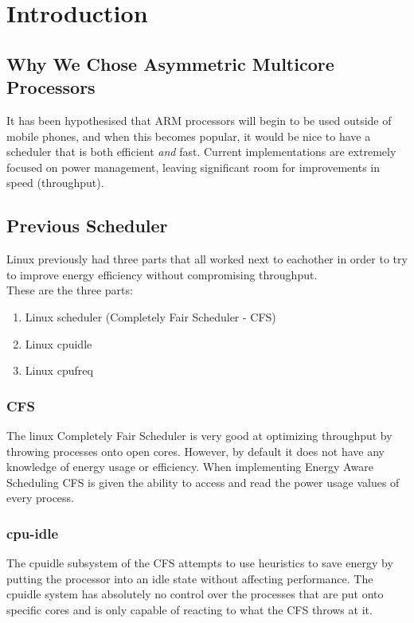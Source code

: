 \section{Introduction}
\subsection{Why We Chose Asymmetric Multicore Processors}
It has been hypothesised that ARM processors will begin to be used outside of mobile phones, and when this becomes popular, it would be nice to have a scheduler that is both efficient \textit{and} fast. Current implementations are extremely focused on power management, leaving significant room for improvements in speed (throughput).

\subsection{Previous Scheduler}
Linux previously had three parts that all worked next to eachother in order to try to improve energy efficiency without compromising throughput.\\
These are the three parts:
\begin{enumerate} 
    \item Linux scheduler (Completely Fair Scheduler - CFS)
    \item Linux cpuidle
    \item Linux cpufreq
\end{enumerate}

\subsubsection{CFS}
The linux Completely Fair Scheduler is very good at optimizing throughput by throwing processes onto open cores. However, by default it does not have any knowledge of energy usage or efficiency. When implementing Energy Aware Scheduling CFS is given the ability to access and read the power usage values of every process.

\subsubsection{cpu-idle}
The cpuidle subsystem of the CFS attempts to use heuristics to save energy by putting the processor into an idle state without affecting performance. The cpuidle system has absolutely no control over the processes that are put onto specific cores and is only capable of reacting to what the CFS throws at it.

